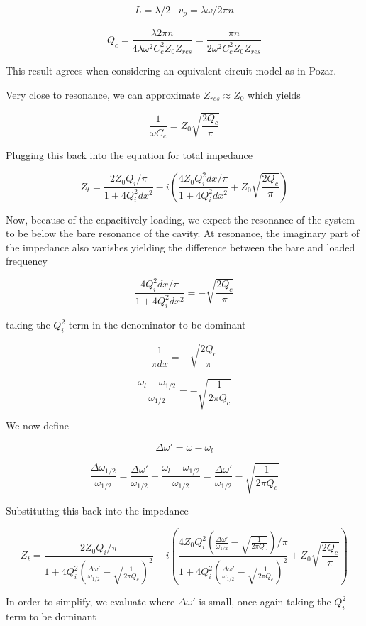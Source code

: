 \documentclass[12pt]{article}
\begin{document}
\[
\begin{array}{cc}
L = \lambda / 2 & v_p = \lambda \omega / 2 \pi n
\end{array}
\]

\[
Q_c = \frac{\lambda 2 \pi n}{4 \lambda \omega^2 C_c^2 Z_0 Z_{res}} = \frac{\pi n}{2 \omega^2 C_c^2 Z_0 Z_{res}}
\]

This result agrees when considering an equivalent circuit model as in Pozar.

Very close to resonance, we can approximate $Z_{res} \approx Z_0$ which yields

\[
\frac{1}{\omega C_c} = Z_0 \sqrt{ \frac{2Q_c}{\pi} }
\]

Plugging this back into the equation for total impedance

\[
Z_t =  \frac{2 Z_0 Q_i/\pi}{1 + 4Q_i^2dx^2} - i \left( \frac{4 Z_0 Q_i^2 dx/\pi}{1 + 4Q_i^2 dx^2} + Z_0 \sqrt{\frac{2 Q_c}{\pi}} \right)
\]

Now, because of the capacitively loading, we expect the resonance of the system to be below the bare resonance of the cavity. At resonance, the imaginary part of the impedance also vanishes yielding the difference between the bare and loaded frequency

\[
\frac{4 Q_i^2 dx/\pi}{1 + 4Q_i^2 dx^2} = -\sqrt{\frac{2Q_c}{\pi}}
\]

taking the $Q_i^2$ term in the denominator to be dominant

\[
\frac{1}{\pi dx} = -\sqrt{\frac{2Q_c}{\pi}}
\]

\[
\frac{\omega_l - \omega_{1/2} }{\omega_{1/2}} = -\sqrt{\frac{1}{2 \pi Q_c}}
\]

We now define

\[
\Delta \omega ' = \omega - \omega_l
\]

\[
\frac{\Delta \omega_{1/2} }{\omega_{1/2}} = \frac{\Delta \omega'}{\omega_{1/2}} + \frac{\omega_l - \omega_{1/2}}{\omega_{1/2}} =  \frac{\Delta \omega'}{\omega_{1/2}} - \sqrt{\frac{1}{2 \pi Q_c}}
\]

Substituting this back into the impedance

\[
Z_t =  \frac{2 Z_0 Q_i/\pi}{1 + 4Q_i^2 \left( \frac{\Delta \omega'}{\omega_{1/2}} - \sqrt{\frac{1}{2 \pi Q_c}}\right)^2} - i \left( \frac{4 Z_0 Q_i^2 \left( \frac{\Delta \omega'}{\omega_{1/2}} - \sqrt{\frac{1}{2 \pi Q_c}}\right)/\pi}{1 + 4Q_i^2 \left( \frac{\Delta \omega'}{\omega_{1/2}} - \sqrt{\frac{1}{2 \pi Q_c}}\right)^2} + Z_0 \sqrt{\frac{2 Q_c}{\pi}} \right)
\]

In order to simplify, we evaluate where $\Delta \omega '$ is small, once again taking the $Q_i^2$ term to be dominant
\end{document}
